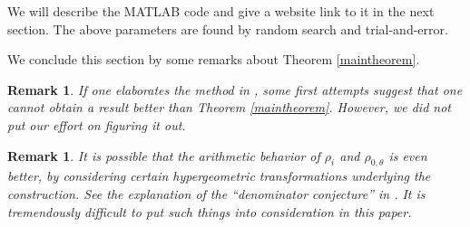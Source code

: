 \documentclass[11pt]{amsart}
\newtheorem{remark}[theorem]{Remark}
\numberwithin{equation}{section}
\begin{document}
We will describe the MATLAB code and give a website link to it in the next section. The above parameters are found by random search and trial-and-error.

We conclude this section by some remarks about Theorem \ref{maintheorem}.

\begin{remark}
If one elaborates the method in \cite{RZ20}, some first attempts suggest that one cannot obtain a result better than Theorem \ref{maintheorem}. However, we did not put our effort on figuring it out.
\end{remark}

\begin{remark}
It is possible that the arithmetic behavior of $\rho_i$ and $\rho_{0,\theta}$ is even better, by considering certain hypergeometric transformations underlying the construction. See the explanation of the ``denominator conjecture'' in \cite[Chapitre 17]{KR07}. It is tremendously difficult to put such things into consideration in this paper.
\end{remark}
\end{document}
